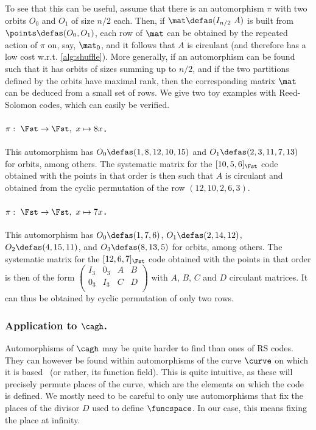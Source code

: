 To see that this can be useful, assume that there is an automorphism $\pi$ with two orbits $O_0$ and $O_1$ of size $n/2$ each. Then, if $\mat \defas (I_{n/2}~A)$ is
built from $\points \defas (O_0, O_1)$, each row of $\mat$ can be obtained by the repeated action of $\pi$ on, say, $\mat_0$, and it follows
that $A$ is circulant (and therefore has a low cost w.r.t. \autoref{alg:shuffle}). More generally, if an automorphism can be found such that it has orbits of sizes summing up to
$n/2$, and if the two partitions defined by the orbits have maximal rank, then the corresponding matrix $\mat$ can be deduced from a small set of rows. We give two toy examples with Reed-Solomon codes, which can easily be verified.

\paragraph{$\pi:~\Fst \rightarrow \Fst,~x \mapsto 8 x$.} This automorphism has $O_0\defas (1, 8, 12, 10, 15)$
and $O_1 \defas (2, 3, 11, 7, 13)$ for orbits, among others. The systematic matrix for the $[10, 5, 6]_{\Fst}$ code obtained with the points in that
order is then such that $A$ is circulant and obtained from the cyclic permutation of the row $(12, 10, 2, 6, 3)$.

\paragraph{$\pi:~\Fst \rightarrow \Fst,~x \mapsto 7 x$.} This automorphism has $O_0 \defas (1, 7, 6)$,
$O_1 \defas (2, 14, 12)$, $O_2 \defas (4, 15, 11)$, and $O_3 \defas (8, 13, 5)$ for orbits, among others.
The systematic matrix for the $[12, 6, 7]_{\Fst}$ code obtained with the points in that
order is then of the form
$\begin{pmatrix}
	I_3 & 0_3 & A & B \\
	0_3 & I_3 & C & D\\
\end{pmatrix}$ with $A$, $B$, $C$ and $D$ circulant matrices. It can thus be obtained by cyclic permutation of only two rows.

\medskip

\subsubsection{Application to $\cagh$.}
Automorphisms of $\cagh$ may be quite harder to find than ones of RS codes. They can however
be found within automorphisms of the curve $\curve$ on which it is based~\cite{stichtenoth} (or rather, its function field). This is quite intuitive, as these will precisely permute
places of the curve, which are the elements on which the code is defined. We mostly need to be careful to only use automorphisms that fix the places of the divisor
$D$ used to define $\funcspace$. In our case, this means fixing the place at infinity.

